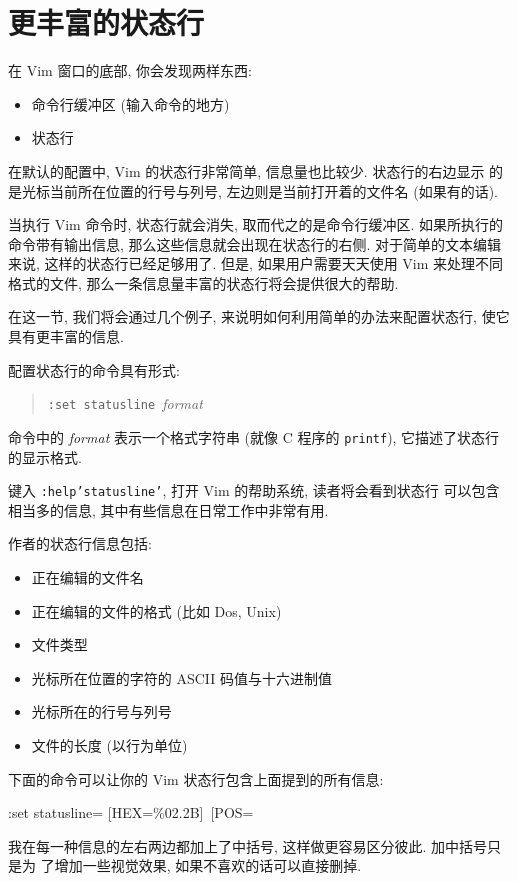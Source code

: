 \section{更丰富的状态行}
\label{sec:a_more_informative_status_line}
在 Vim 窗口的底部, 你会发现两样东西:
\begin{itemize}
    \item 命令行缓冲区 (输入命令的地方)
    \item 状态行
\end{itemize}
在默认的配置中, Vim 的状态行非常简单, 信息量也比较少. 状态行的右边显示
的是光标当前所在位置的行号与列号, 左边则是当前打开着的文件名 (如果有的话).

当执行 Vim 命令时, 状态行就会消失, 取而代之的是命令行缓冲区. 如果所执行的
命令带有输出信息, 那么这些信息就会出现在状态行的右侧.
对于简单的文本编辑来说, 这样的状态行已经足够用了. 但是, 如果用户需要天天使用
Vim 来处理不同格式的文件, 那么一条信息量丰富的状态行将会提供很大的帮助.

在这一节, 我们将会通过几个例子, 来说明如何利用简单的办法来配置状态行, 使它
具有更丰富的信息.

配置状态行的命令具有形式:
\begin{quotation}
\texttt{:set statusline}\ \textit{format}
\end{quotation}
命令中的 \textit{format} 表示一个格式字符串 (就像 C 程序的 \texttt{printf}),
它描述了状态行的显示格式.

键入 \texttt{:help'statusline'}, 打开 Vim 的帮助系统, 读者将会看到状态行
可以包含相当多的信息, 其中有些信息在日常工作中非常有用.

作者的状态行信息包括:
\begin{itemize}
    \item 正在编辑的文件名
    \item 正在编辑的文件的格式 (比如 Dos, Unix)
    \item 文件类型
    \item 光标所在位置的字符的 ASCII 码值与十六进制值
    \item 光标所在的行号与列号
    \item 文件的长度 (以行为单位)
\end{itemize}
下面的命令可以让你的 Vim 状态行包含上面提到的所有信息:
\begin{vimcmd}
:set statusline=%
 [HEX=\%02.2B]\ [POS=%
\end{vimcmd}
我在每一种信息的左右两边都加上了中括号, 这样做更容易区分彼此. 加中括号只是为
了增加一些视觉效果, 如果不喜欢的话可以直接删掉.

